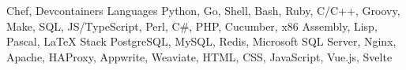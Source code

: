 \begin{cvskills}
{          Chef,
          Devcontainers
        }
    \cvskill
        { Languages }
        {
          Python,
          Go,
          Shell,
          Bash,
          Ruby,
          C/C++,
          Groovy,
          Make,
          SQL,
          JS/TypeScript,
          Perl,
          C\#,
          PHP,
          Cucumber,
          x86 Assembly,
          Lisp,
          Pascal,
          LaTeX
        }
    \cvskill
        { Stack }
        {
          PostgreSQL,
          MySQL,
          Redis,
          Microsoft SQL Server,
          Nginx,
          Apache,
          HAProxy,
          Appwrite,
          Weaviate,
          HTML,
          CSS,
          JavaScript,
          Vue.js,
          Svelte
        }

\end{cvskills}
